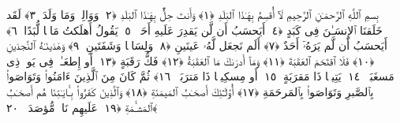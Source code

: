 
  
    
  
    
    

\nopagebreak
  بِسمِ ٱللَّهِ ٱلرَّحمَـٰنِ ٱلرَّحِيمِ
  لَآ أُقسِمُ بِهَـٰذَا ٱلبَلَدِ ﴿١﴾
 وَأَنتَ حِلٌّۢ بِهَـٰذَا ٱلبَلَدِ ﴿٢﴾
 وَوَالِدٍۢ وَمَا وَلَدَ ﴿٣﴾
 لَقَد خَلَقنَا ٱلإِنسَـٰنَ فِى كَبَدٍ ﴿٤﴾
 أَيَحسَبُ أَن لَّن يَقدِرَ عَلَيهِ أَحَدٌۭ ﴿٥﴾
 يَقُولُ أَهلَكتُ مَالًۭا لُّبَدًا ﴿٦﴾
 أَيَحسَبُ أَن لَّم يَرَهُۥٓ أَحَدٌ ﴿٧﴾
 أَلَم نَجعَل لَّهُۥ عَينَينِ ﴿٨﴾
 وَلِسَانًۭا وَشَفَتَينِ ﴿٩﴾
 وَهَدَينَـٰهُ ٱلنَّجدَينِ ﴿١٠﴾
 فَلَا ٱقتَحَمَ ٱلعَقَبَةَ ﴿١١﴾
 وَمَآ أَدرَىٰكَ مَا ٱلعَقَبَةُ ﴿١٢﴾
 فَكُّ رَقَبَةٍ ﴿١٣﴾
 أَو إِطعَـٰمٌۭ فِى يَومٍۢ ذِى مَسغَبَةٍۢ ﴿١٤﴾
 يَتِيمًۭا ذَا مَقرَبَةٍ ﴿١٥﴾
 أَو مِسكِينًۭا ذَا مَترَبَةٍۢ ﴿١٦﴾
 ثُمَّ كَانَ مِنَ ٱلَّذِينَ ءَامَنُوا۟ وَتَوَاصَوا۟ بِٱلصَّبرِ وَتَوَاصَوا۟ بِٱلمَرحَمَةِ ﴿١٧﴾
 أُو۟لَـٰٓئِكَ أَصحَـٰبُ ٱلمَيمَنَةِ ﴿١٨﴾
 وَٱلَّذِينَ كَفَرُوا۟ بِـَٔايَـٰتِنَا هُم أَصحَـٰبُ ٱلمَشـَٔمَةِ ﴿١٩﴾
 عَلَيهِم نَارٌۭ مُّؤصَدَةٌۢ ﴿٢٠﴾
 
